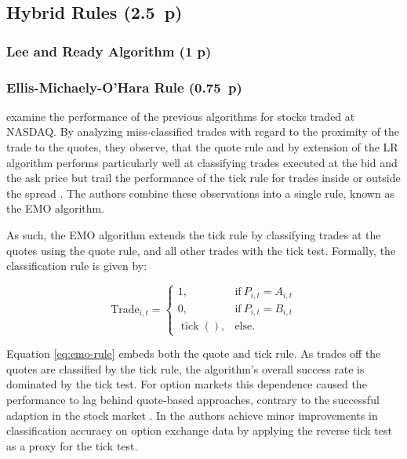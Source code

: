 \subsection{Hybrid Rules (2.5~p)}\label{sec:hybrid-rules}

\subsubsection{Lee and Ready Algorithm (1 p)}\label{sec:lee-and-ready-algorithm}


\subsubsection{Ellis-Michaely-O'Hara
  Rule (0.75~p)}\label{sec:ellis-michaely-ohara-rule}

\textcite[][536]{ellisAccuracyTradeClassification2000} examine the performance of the previous algorithms for stocks traded at NASDAQ. By analyzing miss-classified trades with regard to the proximity of the trade to the quotes, they observe, that the quote rule and by extension of the LR algorithm performs particularly well at classifying trades executed at the bid and the ask price but trail the performance of the tick rule for trades inside or outside the spread \autocite[][535--536]{ellisAccuracyTradeClassification2000}. The authors combine these observations into a single rule, known as the EMO algorithm.

As such, the EMO algorithm \autocite[][540]{ellisAccuracyTradeClassification2000} extends the tick rule by classifying trades at the quotes using the quote rule, and all other trades with the tick test. Formally, the classification rule is given by:

\begin{equation}
  \text{Trade}_{i,t}=
  \begin{cases}
    1,                     & \text{if}\ P_{i, t} = A_{i, t} \\
    0,                     & \text{if}\ P_{i, t} = B_{i, t} \\
    \operatorname{tick}(), & \text{else}.
  \end{cases}
  \label{eq:emo-rule}
\end{equation}

Equation \ref{eq:emo-rule} embeds both the quote and tick rule. As trades off the quotes are classified by the tick rule, the algorithm's overall success rate is dominated by the tick test. For option markets \autocites[cp.][891]{savickasInferringDirectionOption2003}[][21]{grauerOptionTradeClassification2022} this dependence caused the performance to lag behind quote-based approaches, contrary to the successful adaption in the stock market \autocites[cp.][541]{ellisAccuracyTradeClassification2000}[][3818]{chakrabartyTradeClassificationAlgorithms2007}. In \textcite[][31--35]{grauerOptionTradeClassification2022} the authors achieve minor improvements in classification accuracy on option exchange data by applying the reverse tick test as a proxy for the tick test.

